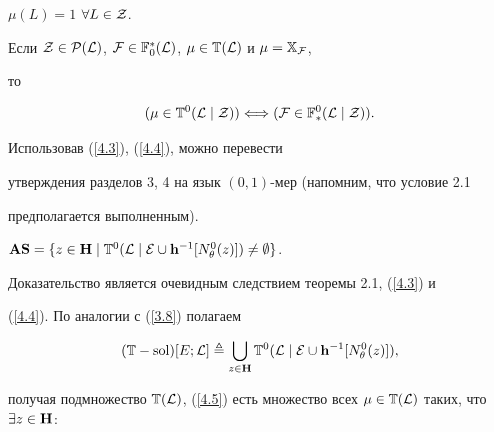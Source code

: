 {${{\mu}(L)} = 1$ \; $\forall{L} \in {\cal Z}$.


Если ${\cal Z} \in {{\cal P}({\cal L})}$, ${\cal F} \in {{\Bbb F}_0^*}({\cal


L})$, $\mu \in {{\Bbb T}({\cal L})}$ и $\mu = {{\Bbb X}_{\cal F}}$,


то


\begin{equation}\label{4.4}


(\mu \in {{\Bbb T}^0}({\cal L}\mid{\cal Z})) \Longleftrightarrow


({\cal F} \in {{\Bbb F}_*^0}({\cal L}\mid{\cal Z})).


\end{equation}


Использовав (\ref{4.3}), (\ref{4.4}), можно перевести


утверждения разделов 3, 4 на язык $(0,1)$-мер (напомним, что условие 2.1


предполагается выполненным).








\begin{props}


${{\bold A}{\bold S}} = \{z \in {\bold H} \mid {{\Bbb T}^0}({\cal L} \mid


{\cal E}\cup{{\bold h}^{-1}}[{N_\theta^0}(z)]) \ne \emp\}$.


\end{props}





Доказательство является очевидным следствием теоремы 2.1, (\ref{4.3}) и


(\ref{4.4}). По аналогии с (\ref{3.8}) полагаем


\begin{equation}\label{4.5}


({\Bbb T}-\sol)[E;{\cal L}] \triangleq \bigcup\limits_{z \in


{\bold H}}{{\Bbb T}^0}({\cal L}\mid{\cal


E}\cup{{\bold h}^{-1}}[{N_\theta^0}(z)]),


\end{equation}


получая подмножество ${\Bbb T}({\cal L})$, (\ref{4.5}) есть множество всех $\mu


\in {{\Bbb T}({\cal L})}$ таких, что $\exi{z} \in {\bold H}$:


\begin{equation}\label{4.6}



\end{equation}}

